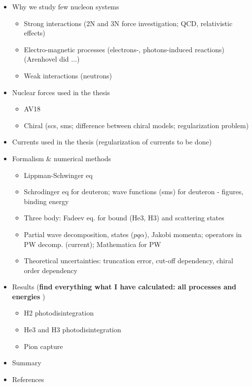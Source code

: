\begin{itemize}
    \item Why we study few nucleon systems
    \begin{itemize}
        \item Strong interactions (2N and 3N force investigation; QCD, relativistic effects)
        \item Electro-magnetic processes (electrons-, photons-induced reactions) (Arenhovel did ...)
        \item Weak interactions (neutrons)
    \end{itemize}

    \item Nuclear forces used in the thesis
    \begin{itemize}
        \item AV18
        \item Chiral (scs, sms; difference between chiral models; regularization problem)
    \end{itemize}

    \item Currents used in the thesis (regularization of currents to be done)
    
    \item Formalism \& numerical methods
    \begin{itemize}
        \item Lippman-Schwinger eq
        \item Schrodinger eq for deuteron; wave functions (sms) for deuteron - figures, binding energy
        \item Three body: Fadeev eq. for bound (He3, H3) and scattering states
        \item Partial wave decomposition, states ($pq\alpha$), Jakobi momenta;
        operators in PW decomp. (current); Mathematica for PW
        \item Theoretical uncertainties: truncation error, cut-off dependency, chiral order dependency
    \end{itemize}

    \item Results (\textbf{find everything what I have calculated: all processes and energies} )
    \begin{itemize}
        \item H2 photodisintegration
        \item He3 and H3 photodisintegration
        \item Pion capture
    \end{itemize}

    \item Summary
    
    \item References
\end{itemize}

